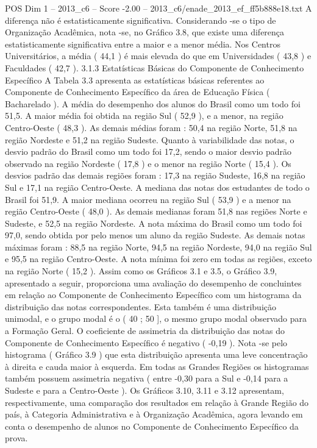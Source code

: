 \begin{textsample}{POS Dim 1 – 2013\_c6 – Score -2.00 – 2013\_c6/enade\_2013\_ef\_ff5b888e18.txt}
A diferença não é estatisticamente significativa.
Considerando -se o tipo de Organização Acadêmica, nota -se, no Gráfico 3.8, que existe uma diferença estatisticamente significativa entre a maior e a menor média.
Nos Centros Universitários, a média ( 44,1 ) é mais elevada do que em Universidades ( 43,8 ) e Faculdades ( 42,7 ). 3.1.3 Estatísticas Básicas do Componente de Conhecimento Específico A Tabela 3.3 apresenta as estatísticas básicas referentes ao Componente de Conhecimento Específico da área de Educação Física ( Bacharelado ).
A média do desempenho dos alunos do Brasil como um todo foi 51,5.
A maior média foi obtida na região Sul ( 52,9 ), e a menor, na região Centro-Oeste ( 48,3 ).
As demais médias foram : 50,4 na região Norte, 51,8 na região Nordeste e 51,2 na região Sudeste.
Quanto à variabilidade das notas, o desvio padrão do Brasil como um todo foi 17,2, sendo o maior desvio padrão observado na região Nordeste ( 17,8 ) e o menor na região Norte ( 15,4 ).
Os desvios padrão das demais regiões foram : 17,3 na região Sudeste, 16,8 na região Sul e 17,1 na região Centro-Oeste.
A mediana das notas dos estudantes de todo o Brasil foi 51,9.
A maior mediana ocorreu na região Sul ( 53,9 ) e a menor na região Centro-Oeste ( 48,0 ).
As demais medianas foram 51,8 nas regiões Norte e Sudeste, e 52,5 na região Nordeste.
A nota máxima do Brasil como um todo foi 97,0, sendo obtida por pelo menos um aluno da região Sudeste.
As demais notas máximas foram : 88,5 na região Norte, 94,5 na região Nordeste, 94,0 na região Sul e 95,5 na região Centro-Oeste.
A nota mínima foi zero em todas as regiões, exceto na região Norte ( 15,2 ).
Assim como os Gráficos 3.1 e 3.5, o Gráfico 3.9, apresentado a seguir, proporciona uma avaliação do desempenho de concluintes em relação ao Componente de Conhecimento Específico com um histograma da distribuição das notas correspondentes.
Esta também é uma distribuição unimodal, e o grupo modal é o ( 40 ; 50 ], o mesmo grupo modal observado para a Formação Geral.
O coeficiente de assimetria da distribuição das notas do Componente de Conhecimento Específico é negativo ( -0,19 ).
Nota -se pelo histograma ( Gráfico 3.9 ) que esta distribuição apresenta uma leve concentração à direita e cauda maior à esquerda.
Em todas as Grandes Regiões os histogramas também possuem assimetria negativa ( entre -0,30 para a Sul e -0,14 para a Sudeste e para a Centro-Oeste ).
Os Gráficos 3.10, 3.11 e 3.12 apresentam, respectivamente, uma comparação dos resultados em relação à Grande Região do país, à Categoria Administrativa e à Organização Acadêmica, agora levando em conta o desempenho de alunos no Componente de Conhecimento Específico da prova.

\end{textsample}
